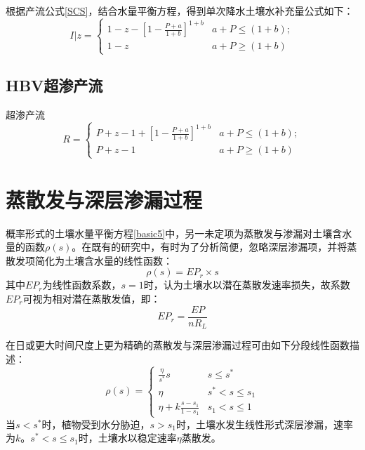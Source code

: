 根据产流公式\ref{SCS}，结合水量平衡方程，得到单次降水土壤水补充量公式如下：
\begin{equation}
I\vert z=
 \begin{cases}
 1-z-[1-\frac{P+a}{1+b}]^{1+b}&{a+P\leq (1+b)};\\1-z &{a+P\geq (1+b)}
 \end{cases}
\end{equation}

\subsection{HBV超渗产流}
\iffalse
HBtrom (1976) and it was selected because it has a relatively low number
of parameters and requires only standard meteorological data

The model used in this analysis was based on the HBV3 model developed for
Scandinavian catchments by Bergstrom (1976) and co-workers at the Swedish
Meteorological and Hydrological Institute (SMHI). It was further refined by
Jensen (1982) and Braun (1985) and applied to Swiss lowland and lower alpine
basins. A detailed description of the model structure is given by Renner (1988). 
\fi
超渗产流
\begin{equation}
R=
 \begin{cases}
 P+z-1+[1-\frac{P+a}{1+b}]^{1+b}&{a+P\leq (1+b)};\\P+z-1 &{a+P\geq (1+b)}
 \end{cases}
\end{equation}


 

 
\fi

\section{蒸散发与深层渗漏过程}
概率形式的土壤水量平衡方程\ref{basic5}中，另一未定项为蒸散发与渗漏对土壤含水量的函数$\rho (s)$。在既有的研究中，有时为了分析简便，忽略深层渗漏项，并将蒸散发项简化为土壤含水量的线性函数：
\begin{equation}
\label{linearep}
\rho (s)=EP_r \times s
\end{equation}
其中$EP_r$为线性函数系数，$s=1$时，认为土壤水以潜在蒸散发速率损失，故系数$EP_r$可视为相对潜在蒸散发值，即：
\begin{equation}
\label{rree}
EP_r=\frac{EP}{nR_L}
\end{equation}

在日或更大时间尺度上更为精确的蒸散发与深层渗漏过程可由如下分段线性函数描述\cite{eagleson2011land}：
 \begin{equation}
\rho (s)=
 \begin{cases}
 \frac{\eta}{s^*} s  &s\leq s^{*}\\ 
 \eta &s^*<s\leq s_1\\
 \eta+k\frac{s-s_1}{1-s_1} &s_1<s\leq 1
 \end{cases}
 \end{equation} 
当$s<s^*$时，植物受到水分胁迫，$s>s_1$时，土壤水发生线性形式深层渗漏，速率为$k$。$s^*<s\leq s_1$时，土壤水以稳定速率$\eta$蒸散发。

